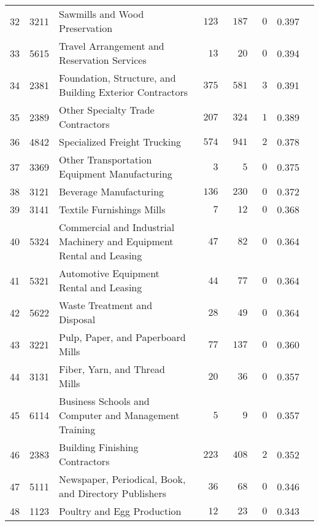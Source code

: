 \documentclass[9pt, oneside]{article}   	%
\begin{document}
\begin{longtable}{lcp{3 in}ccccc}
32  & 3211 & Sawmills and Wood Preservation & $\phantom{0}123$ & $\phantom{0}187$ & $\phantom{0}0$ & 0.397 \\
33  & 5615 & Travel Arrangement and Reservation Services & $\phantom{00}13$ & $\phantom{00}20$ & $\phantom{0}0$ & 0.394 \\
34  & 2381 & Foundation, Structure, and Building Exterior Contractors & $\phantom{0}375$ & $\phantom{0}581$ & $\phantom{0}3$ & 0.391 \\
35  & 2389 & Other Specialty Trade Contractors & $\phantom{0}207$ & $\phantom{0}324$ & $\phantom{0}1$ & 0.389 \\
36  & 4842 & Specialized Freight Trucking & $\phantom{0}574$ & $\phantom{0}941$ & $\phantom{0}2$ & 0.378 \\
37  & 3369 & Other Transportation Equipment Manufacturing & $\phantom{000}3$ & $\phantom{000}5$ & $\phantom{0}0$ & 0.375 \\
38  & 3121 & Beverage Manufacturing & $\phantom{0}136$ & $\phantom{0}230$ & $\phantom{0}0$ & 0.372 \\
39  & 3141 & Textile Furnishings Mills & $\phantom{000}7$ & $\phantom{00}12$ & $\phantom{0}0$ & 0.368 \\
40  & 5324 & Commercial and Industrial Machinery and Equipment Rental and Leasing & $\phantom{00}47$ & $\phantom{00}82$ & $\phantom{0}0$ & 0.364 \\
41  & 5321 & Automotive Equipment Rental and Leasing & $\phantom{00}44$ & $\phantom{00}77$ & $\phantom{0}0$ & 0.364 \\
42  & 5622 & Waste Treatment and Disposal & $\phantom{00}28$ & $\phantom{00}49$ & $\phantom{0}0$ & 0.364 \\
43  & 3221 & Pulp, Paper, and Paperboard Mills & $\phantom{00}77$ & $\phantom{0}137$ & $\phantom{0}0$ & 0.360 \\
44  & 3131 & Fiber, Yarn, and Thread Mills & $\phantom{00}20$ & $\phantom{00}36$ & $\phantom{0}0$ & 0.357 \\
45  & 6114 & Business Schools and Computer and Management Training & $\phantom{000}5$ & $\phantom{000}9$ & $\phantom{0}0$ & 0.357 \\
46  & 2383 & Building Finishing Contractors & $\phantom{0}223$ & $\phantom{0}408$ & $\phantom{0}2$ & 0.352 \\
47  & 5111 & Newspaper, Periodical, Book, and Directory Publishers & $\phantom{00}36$ & $\phantom{00}68$ & $\phantom{0}0$ & 0.346 \\
48  & 1123 & Poultry and Egg Production & $\phantom{00}12$ & $\phantom{00}23$ & $\phantom{0}0$ & 0.343 \\

\end{longtable}
\end{document}
